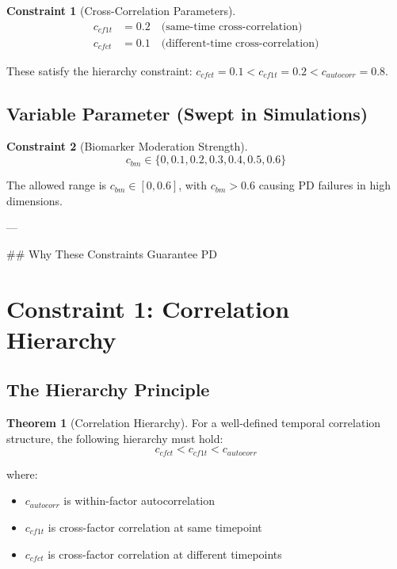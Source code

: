 \documentclass[12pt,a4paper]{article}
\theoremstyle{definition}
\newtheorem{theorem}{Theorem}
\newtheorem{constraint}{Constraint}
\begin{document}
\begin{constraint}[Cross-Correlation Parameters]
\begin{align*}
  c_{cf1t} &= 0.2 \quad \text{(same-time cross-correlation)} \\
  c_{cfct} &= 0.1 \quad \text{(different-time cross-correlation)}
\end{align*}

These satisfy the hierarchy constraint: $c_{cfct} = 0.1 < c_{cf1t} = 0.2 < c_{autocorr} = 0.8$.
\end{constraint}

\subsection{Variable Parameter (Swept in Simulations)}

\begin{constraint}[Biomarker Moderation Strength]
\[
  c_{bm} \in \{0, 0.1, 0.2, 0.3, 0.4, 0.5, 0.6\}
\]

The allowed range is $c_{bm} \in [0, 0.6]$, with $c_{bm} > 0.6$ causing PD failures in high dimensions.
\end{constraint}

---

## Why These Constraints Guarantee PD

\section{Constraint 1: Correlation Hierarchy}

\subsection{The Hierarchy Principle}

\begin{theorem}[Correlation Hierarchy]
\label{thm:hierarchy}
For a well-defined temporal correlation structure, the following hierarchy must hold:
\[
  c_{cfct} < c_{cf1t} < c_{autocorr}
\]

where:
\begin{itemize}
  \item $c_{autocorr}$ is within-factor autocorrelation
  \item $c_{cf1t}$ is cross-factor correlation at same timepoint
  \item $c_{cfct}$ is cross-factor correlation at different timepoints
\end{itemize}
\end{theorem}
\end{document}
